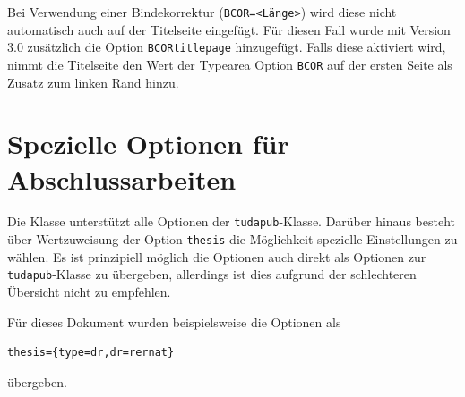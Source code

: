 \documentclass[
	ngerman,%
	accentcolor=9c,%
	ruledheaders=chapter,%
	class=book,%
	thesis={%
		type=dr,
		dr=rernat
	},
	fontsize=11pt,%
	parskip=half-,%
	custommargins=true,%
	marginpar=false,%
]{tudapub}
\newcommand*{\file}[1]{\texttt{#1}}
\newcommand*{\code}[1]{\texttt{#1}}
\begin{document}
Bei Verwendung einer Bindekorrektur (\code{BCOR=<Länge>}) wird diese nicht automatisch auch auf der Titelseite eingefügt. Für diesen Fall wurde mit Version 3.0 zusätzlich die Option \code{BCORtitlepage} hinzugefügt. Falls diese aktiviert wird, nimmt die Titelseite den Wert der Typearea Option \code{BCOR} auf der ersten Seite als Zusatz zum linken Rand hinzu.

\section{Spezielle Optionen für Abschlussarbeiten}
Die Klasse unterstützt alle Optionen der \file{tudapub}-Klasse. Darüber hinaus besteht über Wertzuweisung der Option \code{thesis} die Möglichkeit spezielle Einstellungen zu wählen.
Es ist prinzipiell möglich die Optionen auch direkt als Optionen zur \file{tudapub}-Klasse zu übergeben, allerdings ist dies aufgrund der schlechteren Übersicht nicht zu empfehlen.

Für dieses Dokument wurden beispielsweise die Optionen als
\begin{verbatim}
thesis={type=dr,dr=rernat}
\end{verbatim}
übergeben.
\end{document}
